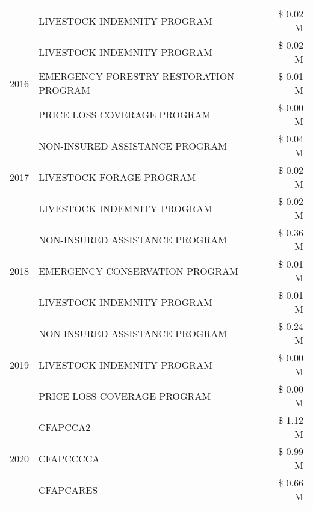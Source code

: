 \begin{tabular}{llr}
 & LIVESTOCK INDEMNITY PROGRAM & \$ 0.02 M \\
\cline{1-3}
\multirow[t]{3}{*}{2016} & LIVESTOCK INDEMNITY PROGRAM                   & \$ 0.02 M \\
 & EMERGENCY FORESTRY RESTORATION PROGRAM        & \$ 0.01 M \\
 & PRICE LOSS COVERAGE PROGRAM                   & \$ 0.00 M \\
\cline{1-3}
\multirow[t]{3}{*}{2017} & NON-INSURED ASSISTANCE PROGRAM & \$ 0.04 M \\
 & LIVESTOCK FORAGE PROGRAM & \$ 0.02 M \\
 & LIVESTOCK INDEMNITY PROGRAM & \$ 0.02 M \\
\cline{1-3}
\multirow[t]{3}{*}{2018} & NON-INSURED ASSISTANCE PROGRAM & \$ 0.36 M \\
 & EMERGENCY CONSERVATION PROGRAM & \$ 0.01 M \\
 & LIVESTOCK INDEMNITY PROGRAM & \$ 0.01 M \\
\cline{1-3}
\multirow[t]{3}{*}{2019} & NON-INSURED ASSISTANCE PROGRAM & \$ 0.24 M \\
 & LIVESTOCK INDEMNITY PROGRAM & \$ 0.00 M \\
 & PRICE LOSS COVERAGE PROGRAM & \$ 0.00 M \\
\cline{1-3}
\multirow[t]{3}{*}{2020} & CFAPCCA2 & \$ 1.12 M \\
 & CFAPCCCCA & \$ 0.99 M \\
 & CFAPCARES & \$ 0.66 M \\
\cline{1-3}
\bottomrule
\end{tabular}
